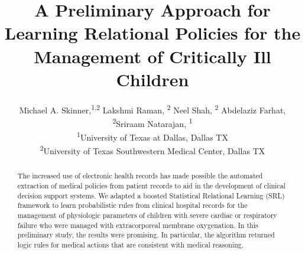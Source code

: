 \documentclass[letterpaper]{article} %
\title{A Preliminary Approach for Learning Relational Policies for the Management of Critically Ill Children}
\author{Michael A. Skinner,\textsuperscript{\rm 1,2} Lakshmi Raman, \textsuperscript{\rm 2} Neel Shah, \textsuperscript{\rm 2} Abdelaziz Farhat, \textsuperscript{\rm 2}Sriraam Natarajan, \textsuperscript{\rm 1}\\ %
\textsuperscript{\rm 1}University of Texas at Dallas, Dallas TX\\
\textsuperscript{\rm 2}University of Texas Southwestern Medical Center, Dallas TX%
}
\def\UrlFont{\rm}  %
\begin{document}
\maketitle

%
%
%
%
\newcommand{\sn}[1]{\textcolor{Red}{[#1 \textsc{--Sriraam}]}}
\newcommand{\ms}[1]{\textcolor{Blue}{[#1 \textsc{--Mike}]}}
%
%
%
%
%
%
%
\begin{abstract}
The increased use of electronic health records has made possible the automated extraction of medical policies from patient records to aid in the development of clinical decision support systems. We adapted a boosted Statistical Relational Learning (SRL) framework to learn probabilistic rules from clinical hospital records for the management of physiologic parameters of children with severe cardiac or respiratory failure who were managed with extracorporeal membrane oxygenation. In this preliminary study, the results were promising. In particular, the algorithm returned logic rules for medical actions that are consistent with medical reasoning.

\end{abstract}
%
%
%
\end{document}

